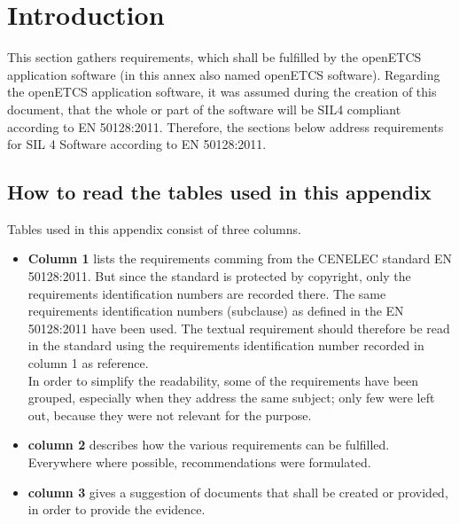 \documentclass{template/openetcs_report}
\begin{document}
\section{Introduction}
This section gathers requirements, which shall be fulfilled by the openETCS application software (in this annex also named openETCS software).
Regarding the openETCS application software, it was assumed during the creation of this document, that the whole or part of the software will be SIL4 compliant according to EN 50128:2011. Therefore, the sections below address requirements for SIL 4 Software according to EN 50128:2011.

\subsection{How to read the tables used in this appendix}
Tables used in this appendix consist of three columns.
\begin{itemize}\itemsep=0pt
  \item \textbf{Column 1} lists the requirements comming from the CENELEC standard EN 50128:2011. But since the standard is protected by copyright, only the requirements identification numbers are recorded there. The same requirements identification numbers (subclause) as defined in the EN 50128:2011 have been used. The textual requirement should therefore be read in the standard using the requirements identification number recorded in column 1 as reference.\\
In order to simplify the readability, some of the requirements have been grouped, especially when they address the same subject; only few were left out, because they were not relevant for the purpose.
  \item \textbf{column 2} describes how the various requirements can be fulfilled. Everywhere where possible, recommendations were formulated.
  \item \textbf{column 3} gives a suggestion of documents that shall be created or provided, in order to provide the evidence.
\end{itemize}
\end{document}
